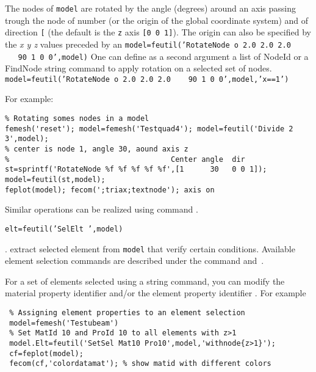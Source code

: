 
 The nodes of {\tt model} are rotated by the angle  (degrees) around an axis passing trough the node of number  (or the origin of the global coordinate system) and of direction {\tt [}\tsi{nx ny nz}{\tt ]} (the default is the {\tt z} axis {\tt [0 0 1]}). The origin can also be specified by the {\sl x y z} values preceded by an 
{\tt model=feutil('RotateNode o 2.0 2.0 2.0 \ \ \  90  1 0 0',model)}
One can define as a second argument a list of NodeId or a FindNode string command to apply rotation on a selected set of nodes.
{\tt model=feutil('RotateNode o 2.0 2.0 2.0 \ \ \  90  1 0 0',model,'x==1')}

For example:

\begin{verbatim}
% Rotating somes nodes in a model
femesh('reset'); model=femesh('Testquad4'); model=feutil('Divide 2 3',model); 
% center is node 1, angle 30, aound axis z
%                                     Center angle  dir
st=sprintf('RotateNode %f %f %f %f %f',[1      30   0 0 1]);
model=feutil(st,model);  
feplot(model); fecom(';triax;textnode'); axis on
\end{verbatim}%

Similar operations can be realized using command \basis {}.



{\tt elt=feutil('SelElt  ',model)}

.  extract selected element from {\tt model} that verify certain conditions. Available element selection commands are described under the  command and~. 


 For a set of elements selected using a  string command, you can modify the material property identifier  and/or the element property identifier . 
For example

\begin{verbatim}
 % Assigning element properties to an element selection
 model=femesh('Testubeam')
 % Set MatId 10 and ProId 10 to all elements with z>1
 model.Elt=feutil('SetSel Mat10 Pro10',model,'withnode{z>1}');
 cf=feplot(model); 
 fecom(cf,'colordatamat'); % show matid with different colors
\end{verbatim}

